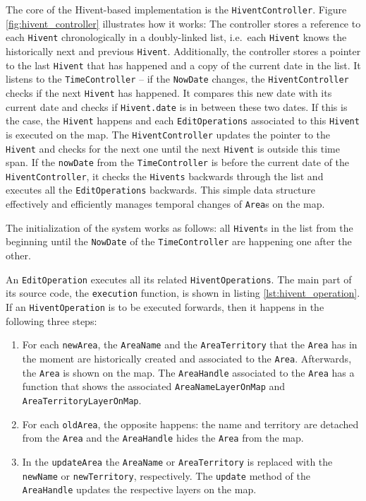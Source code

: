 The core of the Hivent-based implementation is the \texttt{HiventController}. Figure \ref{fig:hivent_controller} illustrates how it works: The controller stores a reference to each \texttt{Hivent} chronologically in a doubly-linked list, i.e.\ each \texttt{Hivent} knows the historically next and previous \texttt{Hivent}. Additionally, the controller stores a pointer to the last \texttt{Hivent} that has happened and a copy of the current date in the list. It listens to the \texttt{TimeController} -- if the \texttt{NowDate} changes, the \texttt{HiventController} checks if the next \texttt{Hivent} has happened. It compares this new date with its current date and checks if \texttt{Hivent.date} is in between these two dates. If this is the case, the \texttt{Hivent} happens and each \texttt{EditOperations} associated to this \texttt{Hivent} is executed on the map. The \texttt{HiventController} updates the pointer to the \texttt{Hivent} and checks for the next one until the next \texttt{Hivent} is outside this time span. If the \texttt{nowDate} from the \texttt{TimeController} is before the current date of the \texttt{HiventController}, it checks the \texttt{Hivents} backwards through the list and executes all the \texttt{EditOperations} backwards. This simple data structure effectively and efficiently manages temporal changes of \texttt{Area}s on the map.

The initialization of the system works as follows: all \texttt{Hivent}s in the list from the beginning until the \texttt{NowDate} of the \texttt{TimeController} are happening one after the other.

An \texttt{EditOperation} executes all its related \texttt{HiventOperations}. The main part of its source code, the \texttt{execution} function, is shown in listing \ref{lst:hivent_operation}. If an \texttt{HiventOperation} is to be executed forwards, then it happens in the following three steps:

\begin{enumerate}
  \item For each \texttt{newArea}, the \texttt{AreaName} and the \texttt{AreaTerritory} that the \texttt{Area} has in the moment are historically created and associated to the \texttt{Area}. Afterwards, the \texttt{Area} is shown on the map. The \texttt{AreaHandle} associated to the \texttt{Area} has a function that shows the associated \texttt{AreaNameLayerOnMap} and \texttt{AreaTerritoryLayerOnMap}.
  \item For each \texttt{oldArea}, the opposite happens: the name and territory are detached from the \texttt{Area} and the \texttt{AreaHandle} hides the \texttt{Area} from the map.
  \item In the \texttt{updateArea} the \texttt{AreaName} or \texttt{AreaTerritory} is replaced with the \texttt{newName} or \texttt{newTerritory}, respectively. The \texttt{update} method of the \texttt{AreaHandle} updates the respective layers on the map.
\end{enumerate}

